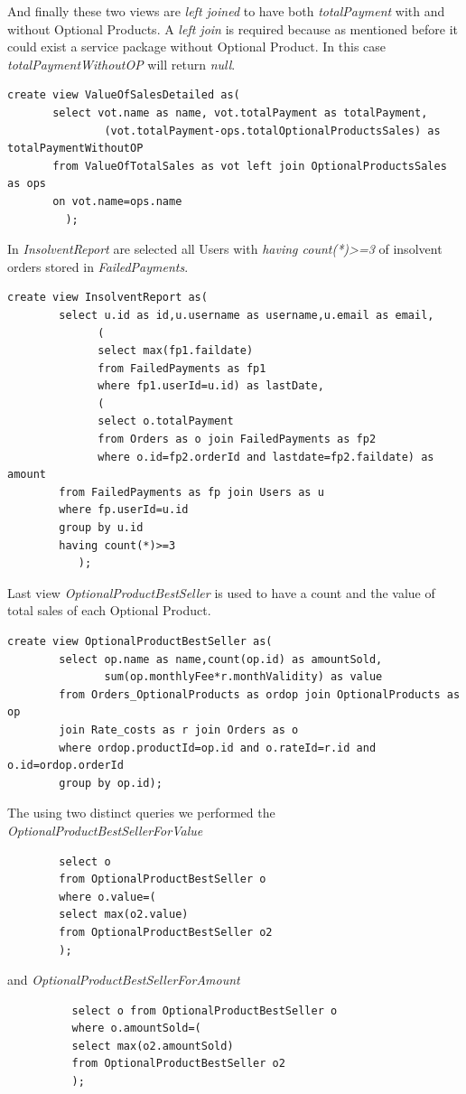 \documentclass{article}
\begin{document}
And finally these two views are \emph{left joined} to have both \emph{totalPayment} with and without Optional Products. A \emph{left join} is required because as mentioned before it could exist a service package without Optional Product. In this case \emph{totalPaymentWithoutOP} will return \emph{null}.
\begin{lstlisting}
create view ValueOfSalesDetailed as(
       select vot.name as name, vot.totalPayment as totalPayment, 
               (vot.totalPayment-ops.totalOptionalProductsSales) as totalPaymentWithoutOP
       from ValueOfTotalSales as vot left join OptionalProductsSales as ops
       on vot.name=ops.name
         );
\end{lstlisting}                                     


In \emph{InsolventReport} are selected all Users with \emph{having count(*)\textgreater=3} of insolvent orders stored in \emph{FailedPayments}.
\begin{lstlisting}
create view InsolventReport as(
        select u.id as id,u.username as username,u.email as email,
              (
              select max(fp1.faildate) 
              from FailedPayments as fp1  
              where fp1.userId=u.id) as lastDate,
              (
              select o.totalPayment 
              from Orders as o join FailedPayments as fp2 
              where o.id=fp2.orderId and lastdate=fp2.faildate) as amount
        from FailedPayments as fp join Users as u
        where fp.userId=u.id
        group by u.id
        having count(*)>=3
           );
\end{lstlisting}

Last view  \emph{OptionalProductBestSeller} is used to have a count and the value of total sales of each Optional Product.
\begin{lstlisting}
create view OptionalProductBestSeller as(
        select op.name as name,count(op.id) as amountSold, 
               sum(op.monthlyFee*r.monthValidity) as value
        from Orders_OptionalProducts as ordop join OptionalProducts as op 
        join Rate_costs as r join Orders as o
        where ordop.productId=op.id and o.rateId=r.id and o.id=ordop.orderId
        group by op.id);
\end{lstlisting}
The using two distinct queries we performed the  \emph{OptionalProductBestSellerForValue}
\begin{lstlisting}
        select o 
        from OptionalProductBestSeller o 
        where o.value=(
        select max(o2.value) 
        from OptionalProductBestSeller o2
        );
\end{lstlisting}
and  \emph{OptionalProductBestSellerForAmount}
\begin{lstlisting}
          select o from OptionalProductBestSeller o 
          where o.amountSold=(
          select max(o2.amountSold) 
          from OptionalProductBestSeller o2
          );
\end{lstlisting}
\newpage
\end{document}

